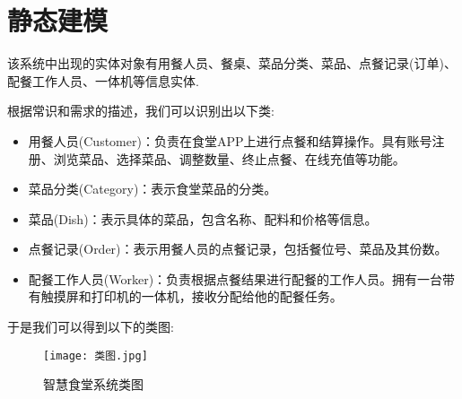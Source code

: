 \documentclass[../main.tex]{subfiles}
\begin{document}
%
\section{静态建模}
该系统中出现的实体对象有用餐人员、餐桌、菜品分类、菜品、点餐记录(订单)、
配餐工作人员、一体机等信息实体.

根据常识和需求的描述，我们可以识别出以下类:
\begin{itemize}
  \item 用餐人员(Customer)：负责在食堂APP上进行点餐和结算操作。具有账号注册、浏览菜品、选择菜品、调整数量、终止点餐、在线充值等功能。
  \item 菜品分类(Category)：表示食堂菜品的分类。
  \item 菜品(Dish)：表示具体的菜品，包含名称、配料和价格等信息。
  \item 点餐记录(Order)：表示用餐人员的点餐记录，包括餐位号、菜品及其份数。
  \item 配餐工作人员(Worker)：负责根据点餐结果进行配餐的工作人员。拥有一台带有触摸屏和打印机的一体机，接收分配给他的配餐任务。
\end{itemize}
%
于是我们可以得到以下的类图:
\begin{figure}[H]
  \begin{center}
    \texttt{[image: 类图.jpg]}
  \end{center}
  \caption{智慧食堂系统类图}
\end{figure}
%
\end{document}
